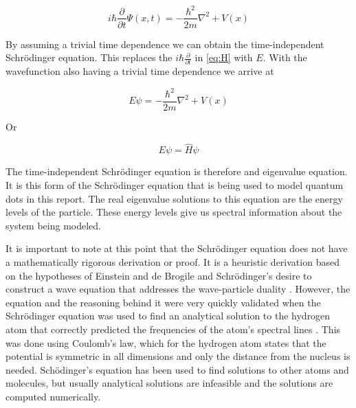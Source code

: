 \documentclass[authoryearcitations]{UoYCSproject}
\begin{document}
\begin{equation}
i\hbar\frac{\partial}{\partial t}\Psi (x,t) = -\frac{\hbar ^2}{2m}\nabla ^2 + V(x)
\label{eq:H}
\end{equation}

By assuming a trivial time dependence we can obtain the time-independent Schr\"{o}dinger equation. This replaces
the $i\hbar \frac{\partial}{\partial t}$ in \ref{eq:H} with $E$. With the wavefunction also having a trivial time
dependence we arrive at

\begin{equation}
E\psi = -\frac{\hbar ^2}{2m}\nabla ^2 + V(x) 
\label{eq:timeIndependent}
\end{equation}


Or

\begin{equation}
E\psi = \hat{H}\psi  
\label{eq:eigenSchrodinger}
\end{equation}

The time-independent Schr\"{o}dinger equation is therefore and eigenvalue equation. It is this form of the
Schr\"{o}dinger equation that is being used to model quantum dots in this report. 
The real eigenvalue solutions to this equation are the energy levels
of the particle. These energy levels give us spectral information about the system being modeled. 


It is important to note at this point that the Schr\"{o}dinger equation does not have a mathematically rigorous 
derivation or proof. It is a heuristic derivation based on the hypotheses of Einstein and de Brogile and Schr\"{o}dinger's
desire to construct a wave equation that addresses the wave-particle duality \cite{ricardo, qp}. %
However, the equation and the reasoning behind it were very quickly validated when the Schr\"{o}dinger equation was used
to find an analytical solution to the hydrogen atom that correctly predicted the frequencies of the atom's spectral lines
\cite{qp}. This was done using Coulomb's law, which for the hydrogen atom states that the potential is symmetric in all dimensions
and only the distance from the nucleus is needed. Sch\"{o}dinger's equation has been used to find solutions to other atoms and
molecules, but usually analytical solutions are infeasible and the solutions are computed numerically. 

\end{document}
